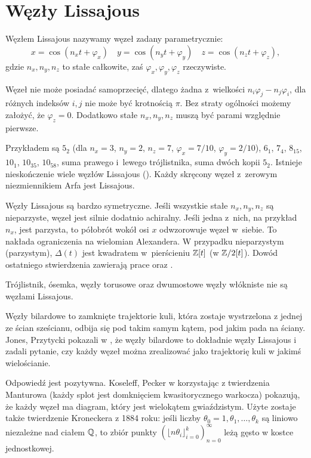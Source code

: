 \section{Węzły Lissajous} %
\label{sec:lissajous}

\begin{definition}
	Węzłem Lissajous nazywamy węzeł zadany parametrycznie:
	\[
		x = \cos(n_xt + \varphi_x) \quad
		y = \cos(n_yt + \varphi_y) \quad
		z = \cos(n_zt + \varphi_z),
	\]
	gdzie $n_x, n_y, n_z$ to stałe całkowite, zaś $\varphi_x, \varphi_y, \varphi_z$ rzeczywiste.
\end{definition}

Węzeł nie może posiadać samoprzecięć, dlatego żadna z~wielkości $n_i\varphi_j-n_j\varphi_i$, dla różnych indeksów $i, j$ nie może być krotnością $\pi$.
Bez straty ogólności możemy założyć, że $\varphi_z = 0$.
Dodatkowo stałe $n_x, n_y, n_z$ muszą być parami względnie pierwsze.

Przykładem są $5_2$ (dla $n_x = 3$, $n_y = 2$, $n_z = 7$, $\varphi_x = 7/10$, $\varphi_y = 2/10$), $6_1$, $7_4$, $8_{15}$, $10_1$, $10_{35}$, $10_{58}$, suma prawego i~lewego trójlistnika, suma dwóch kopii $5_2$.
Istnieje nieskończenie wiele węzłów Lissajous (\cite{lamm97}).
Każdy skręcony węzeł z~zerowym niezmiennikiem Arfa jest Lissajous.

Węzły Lissajous są bardzo symetryczne.
Jeśli wszystkie stałe $n_x, n_y, n_z$ są nieparzyste, węzeł jest silnie dodatnio achiralny.
Jeśli jedna z~nich, na przykład $n_x$, jest parzysta, to półobrót wokół osi $x$ odwzorowuje węzeł w~siebie.
To nakłada ograniczenia na wielomian Alexandera.
W przypadku nieparzystym (parzystym), $\Delta(t)$ jest kwadratem w~pierścieniu $\mathbb Z[t]$ (w $\mathbb Z/2[t]$).
Dowód ostatniego stwierdzenia zawierają prace \cite{hartley79} oraz \cite{murasugi71}.

\begin{corollary}
	Trójlistnik, ósemka, węzły torusowe oraz dwumostowe węzły włókniste nie są węzłami Lissajous.
\end{corollary}

Węzły bilardowe to zamknięte trajektorie kuli, która zostaje wystrzelona z jednej ze ścian sześcianu, odbija się pod takim samym kątem, pod jakim pada na ściany.
Jones, Przytycki pokazali w \cite{jones98}, że węzły bilardowe to dokładnie węzły Lissajous i zadali pytanie, czy każdy węzeł można zrealizować jako trajektorię kuli w jakimś wielościanie.

Odpowiedź jest pozytywna.
Koseleff, Pecker w \cite{koseleff14} korzystając z twierdzenia Manturowa (każdy splot jest domknięciem kwasitorycznego warkocza) pokazują, że każdy węzeł ma diagram, który jest wielokątem gwiaździstym.
Użyte zostaje także twierdzenie Kroneckera z 1884 roku: jeśli liczby $\theta_0 = 1, \theta_1, \ldots, \theta_k$ są liniowo niezależne nad ciałem $\mathbb Q$, to zbiór punkty $(\lfloor n\theta_i \rfloor_{i=0}^k)_{n=0}^\infty$ leżą gęsto w kostce jednostkowej.

